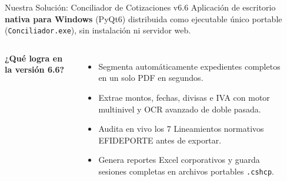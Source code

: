 \documentclass[aspectratio=169, 11pt]{beamer}
\begin{document}
\begin{frame}{Nuestra Solución: Conciliador de Cotizaciones v6.6}
    Aplicación de escritorio \textbf{nativa para Windows} (PyQt6) distribuida como ejecutable único portable (\texttt{Conciliador.exe}), sin instalación ni servidor web.

    \vspace{0.4cm}
    \begin{columns}[T]
        \textbf{¿Qué logra en la versión 6.6?}
        \begin{itemize}
            \item Segmenta automáticamente expedientes completos en un solo PDF en segundos.
            \item Extrae montos, fechas, divisas e IVA con motor multinivel y OCR avanzado de doble pasada.
            \item Audita en vivo los 7 Lineamientos normativos EFIDEPORTE antes de exportar.
            \item Genera reportes Excel corporativos y guarda sesiones completas en archivos portables \texttt{.cshcp}.
        \end{itemize}

        \begin{center}
        \end{center}
    \end{columns}
\end{frame}
\end{document}
